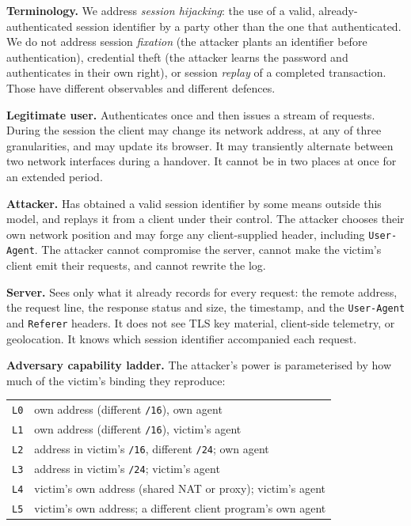 \documentclass[conference]{IEEEtran}
\begin{document}
\noindent\textbf{Terminology.}  We address \emph{session hijacking}: the use of
a valid, already-authenticated session identifier by a party other than the one
that authenticated.  We do not address session \emph{fixation} (the attacker
plants an identifier before authentication), credential theft (the attacker
learns the password and authenticates in their own right), or session
\emph{replay} of a completed transaction.  Those have different observables and
different defences.

\noindent\textbf{Legitimate user.}  Authenticates once and then issues a stream
of requests.  During the session the client may change its network address, at
any of three granularities, and may update its browser.  It may transiently
alternate between two network interfaces during a handover.  It cannot be in two
places at once for an extended period.

\noindent\textbf{Attacker.}  Has obtained a valid session identifier by some
means outside this model, and replays it from a client under their control.
The attacker chooses their own network position and may forge any
client-supplied header, including \texttt{User-Agent}.  The attacker cannot
compromise the server, cannot make the victim's client emit their requests, and
cannot rewrite the log.

\noindent\textbf{Server.}  Sees only what it already records for every request:
the remote address, the request line, the response status and size, the
timestamp, and the \texttt{User-Agent} and \texttt{Referer} headers.  It does
not see TLS key material, client-side telemetry, or geolocation.  It knows
which session identifier accompanied each request.

\noindent\textbf{Adversary capability ladder.}  The attacker's power is
parameterised by how much of the victim's binding they reproduce:

\smallskip
\noindent\begin{tabular}{@{}l@{\quad}p{}@{}}
\texttt{L0} & own address (different \texttt{/16}), own agent\\
\texttt{L1} & own address (different \texttt{/16}), victim's agent\\
\texttt{L2} & address in victim's \texttt{/16}, different \texttt{/24}; own agent\\
\texttt{L3} & address in victim's \texttt{/24}; victim's agent\\
\texttt{L4} & victim's own address (shared NAT or proxy); victim's agent\\
\texttt{L5} & victim's own address; a different client program's own agent\\
\end{tabular}
\smallskip
\end{document}
